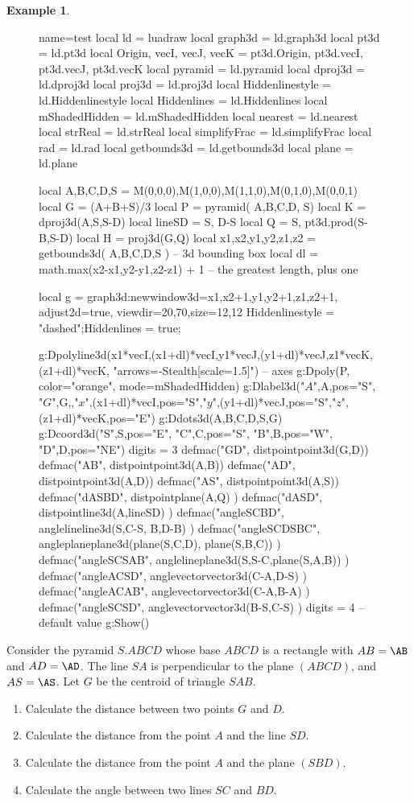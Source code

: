 \documentclass[12pt]{article}
\theoremstyle{definition}
\newtheorem{EX}{Example}
\def\shortcuts{%
local ld = luadraw
local graph3d = ld.graph3d
local pt3d = ld.pt3d
local Origin, vecI, vecJ, vecK = pt3d.Origin, pt3d.vecI, pt3d.vecJ, pt3d.vecK
local pyramid = ld.pyramid
local dproj3d = ld.dproj3d
local proj3d = ld.proj3d
local Hiddenlinestyle = ld.Hiddenlinestyle
local Hiddenlines = ld.Hiddenlines
local mShadedHidden = ld.mShadedHidden
local nearest = ld.nearest
local strReal = ld.strReal
local simplifyFrac = ld.simplifyFrac
local rad = ld.rad
local getbounds3d = ld.getbounds3d
local plane = ld.plane
}%
\begin{document}
\begin{EX}
\begin{figure}[H]
  \centering
\begin{luadraw}{name=test}
\shortcuts
local A,B,C,D,S = M(0,0,0),M(1,0,0),M(1,1,0),M(0,1,0),M(0,0,1)
local G = (A+B+S)/3
local P = pyramid( {A,B,C,D}, S)
local K = dproj3d(A,{S,S-D})
local lineSD = {S, D-S} 
local Q = {S, pt3d.prod(S-B,S-D)}
local H = proj3d(G,Q)
local x1,x2,y1,y2,z1,z2 = getbounds3d( {A,B,C,D,S} ) -- 3d bounding box
local dl = math.max(x2-x1,y2-y1,z2-z1) + 1 -- the greatest length, plus one

local g = graph3d:new{window3d={x1,x2+1,y1,y2+1,z1,z2+1}, adjust2d=true, viewdir={20,70},size={12,12}}
Hiddenlinestyle = "dashed";Hiddenlines = true;

g:Dpolyline3d({{x1*vecI,(x1+dl)*vecI},{y1*vecJ,(y1+dl)*vecJ},{z1*vecK,(z1+dl)*vecK}}, "arrows={-Stealth[scale=1.5]}") -- axes
g:Dpoly(P, {color="orange", mode=mShadedHidden})
 g:Dlabel3d("$A$",A,{pos="S"}, "$G$",G,{},"$x$",(x1+dl)*vecI,{pos="S"},"$y$",(y1+dl)*vecJ,{pos="S"},"$z$",(z1+dl)*vecK,{pos="E"})
g:Ddots3d({A,B,C,D,S,G})
g:Dcoord3d("S",S,{pos="E"}, "C",C,{pos="S"}, "B",B,{pos="W"}, "D",D,{pos="NE"})
digits = 3
defmac("GD", distpointpoint3d(G,D))
defmac("AB", distpointpoint3d(A,B))
defmac("AD", distpointpoint3d(A,D))
defmac("AS", distpointpoint3d(A,S))
defmac("dASBD", distpointplane(A,Q) )
defmac("dASD", distpointline3d(A,lineSD) )
defmac("angleSCBD", anglelineline3d({S,C-S}, {B,D-B}) )
defmac("angleSCDSBC", angleplaneplane3d(plane(S,C,D), plane(S,B,C)) )
defmac("angleSCSAB", anglelineplane3d({S,S-C},plane(S,A,B)) )
defmac("angleACSD", anglevectorvector3d(C-A,D-S) )
defmac("angleACAB", anglevectorvector3d(C-A,B-A) )
defmac("angleSCSD", anglevectorvector3d(B-S,C-S) )
digits = 4 -- default value
g:Show()
\end{luadraw}
\caption{}
\end{figure}
Consider the pyramid $S.ABCD$ whose base $ABCD$ is a rectangle with $AB = \AB$ and $AD = \AD$. The line $SA$ is perpendicular to the plane $(ABCD)$, and $AS = \AS$. Let $G$ be the centroid of triangle $SAB$.
\begin{enumerate}[label=\arabic*)]
  \item Calculate the distance between two points $G$ and $D$.
  \item Calculate the distance from the point $A$ and the line $SD$.
  \item Calculate the distance from the point $A$ and the plane $(SBD)$.
  \item Calculate the angle between two lines $SC$ and $BD$.

\end{enumerate}
\end{EX}
\end{document}
